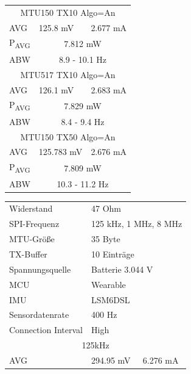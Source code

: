 \begin{figure}[!hbtp]
  \begin{minipage}{0.5\textwidth}
    \centering
    \begin{tabular}{|l|l|l|}
      \hline
      \multicolumn{3}{|c|}{MTU150 TX10 Algo=An}\\
      AVG & 125.8 mV & 2.677 mA\\
      P\textsubscript{AVG} & \multicolumn{2}{c|}{7.812 mW}\\
      ABW & \multicolumn{2}{c|}{8.9 - 10.1 Hz}\\
      \hline
      \multicolumn{3}{|c|}{MTU517 TX10 Algo=An}\\
      AVG & 126.1 mV & 2.683 mA\\
      P\textsubscript{AVG} & \multicolumn{2}{c|}{7.829 mW}\\
      ABW & \multicolumn{2}{c|}{8.4 - 9.4 Hz}\\
      \hline
      \multicolumn{3}{|c|}{MTU150 TX50 Algo=An}\\
      AVG & 125.783 mV & 2.676 mA\\
      P\textsubscript{AVG} & \multicolumn{2}{c|}{7.809 mW}\\
      ABW & \multicolumn{2}{c|}{10.3 - 11.2 Hz}\\
      \hline
    \end{tabular}
    \label{tab:test2b}
    \hfill \break
    \hfill \break
    \begin{tabular}{|l|l|l|}
      \hline
      Widerstand & \multicolumn{2}{l|}{47 Ohm}\\
      SPI-Frequenz & \multicolumn{2}{l|}{125 kHz, 1 MHz, 8 MHz}\\
      MTU-Größe & \multicolumn{2}{l|}{35 Byte}\\
      TX-Buffer & \multicolumn{2}{l|}{10 Einträge}\\
      Spannungsquelle & \multicolumn{2}{l|}{Batterie 3.044 V}\\
      MCU & \multicolumn{2}{l|}{Wearable}\\
      IMU & \multicolumn{2}{l|}{LSM6DSL}\\
      Sensordatenrate & \multicolumn{2}{l|}{400 Hz}\\
      Connection Interval & \multicolumn{2}{l|}{High}\\
      \hline
      \multicolumn{3}{|c|}{125kHz}\\
      AVG & 294.95 mV & 6.276 mA\\

\end{tabular}
\end{minipage}
\end{figure}
